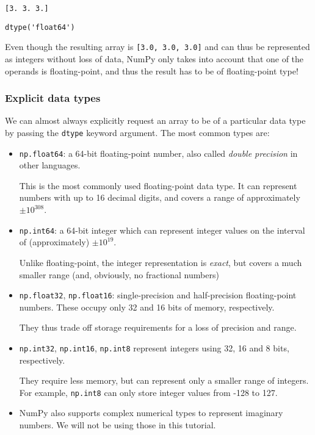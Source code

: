 \documentclass[10pt]{scrartcl}
\makeatletter
\newcommand{\boxspacing}{\kern\kvtcb@left@rule\kern\kvtcb@boxsep}
\newcommand{\prompt}[4]{
        {\ttfamily\llap{{\color{#2}[#3]:\hspace{3pt}#4}}\vspace{-\baselineskip}}
    }
\makeatother
\begin{document}
    \begin{Verbatim}[commandchars=\\\{\}]
[3. 3. 3.]
    \end{Verbatim}

            \begin{tcolorbox}[breakable, size=fbox, boxrule=.5pt, pad at break*=1mm, opacityfill=0]
\prompt{Out}{outcolor}{78}{\boxspacing}
\begin{Verbatim}[commandchars=\\\{\}]
dtype('float64')
\end{Verbatim}
\end{tcolorbox}
        
    Even though the resulting array is \texttt{{[}3.0,\ 3.0,\ 3.0{]}} and
can thus be represented as integers without loss of data, NumPy only
takes into account that one of the operands is floating-point, and thus
the result has to be of floating-point type!

    \hypertarget{explicit-data-types}{%
\subsubsection{Explicit data types}\label{explicit-data-types}}

We can almost always explicitly request an array to be of a particular
data type by passing the \texttt{dtype} keyword argument. The most
common types are:

\begin{itemize}
\item
  \texttt{np.float64}: a 64-bit floating-point number, also called
  \emph{double precision} in other languages.

  This is the most commonly used floating-point data type. It can
  represent numbers with up to 16 decimal digits, and covers a range of
  approximately \(\pm 10^{308}\).
\item
  \texttt{np.int64}: a 64-bit integer which can represent integer values
  on the interval of (approximately) \(\pm10^{19}\).

  Unlike floating-point, the integer representation is \emph{exact}, but
  covers a much smaller range (and, obviously, no fractional numbers)
\item
  \texttt{np.float32}, \texttt{np.float16}: single-precision and
  half-precision floating-point numbers. These occupy only 32 and 16
  bits of memory, respectively.

  They thus trade off storage requirements for a loss of precision and
  range.
\item
  \texttt{np.int32}, \texttt{np.int16}, \texttt{np.int8} represent
  integers using 32, 16 and 8 bits, respectively.

  They require less memory, but can represent only a smaller range of
  integers. For example, \texttt{np.int8} can only store integer values
  from -128 to 127.
\item
  NumPy also supports complex numerical types to represent imaginary
  numbers. We will not be using those in this tutorial.
\end{itemize}
\end{document}

